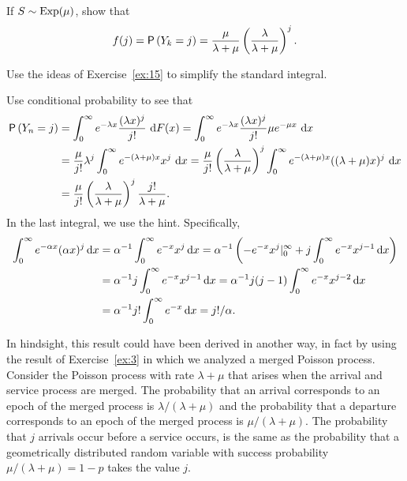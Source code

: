 \begin{extra}\label{ex:74}
 If $S\sim \operatorname{Exp}(\mu)$, show that 
  \begin{equation} \label{eq:41}
f(j) = \P{Y_k = j} = \frac{\mu}{\lambda+\mu}\left(\frac{\lambda}{\lambda+\mu}\right)^j.
  \end{equation}
\begin{hint}
Use the ideas of Exercise~\ref{ex:15} to simplify the standard integral.
\end{hint}
\begin{solution}
Use conditional probability to see that 
\begin{align*}
  \P{Y_n = j} 
&= \int_0^\infty e^{-\lambda x}\frac{(\lambda x)^j}{j!}\, \d F(x) = \int_0^\infty e^{-\lambda x}\frac{(\lambda x)^j}{j!} \mu e^{-\mu x}\, \d x \\
&= \frac{\mu}{j!}\lambda^j \int_0^\infty e^{-(\lambda+\mu) x}x^j\,\d x = \frac{\mu}{j!}\left(\frac{\lambda}{\lambda+\mu}\right)^j \int_0^\infty e^{-(\lambda+\mu) x}((\lambda+\mu)x)^j\,\d x \\
&= \frac{\mu}{j!}\left(\frac{\lambda}{\lambda+\mu}\right)^j \frac{j!}{\lambda+\mu}.
\end{align*}
In the last integral, we use the hint. Specifically, 
\begin{align*}
  \int_0^\infty e^{-\alpha x} (\alpha x)^j \,\text{d}x 
&=  \alpha^{-1} \int_0^\infty e^{- x} x^j \,\text{d}x  
=  \alpha^{-1} \left(-e^{-x}x^j |_0^\infty + j \int_0^\infty e^{- x} x^{j-1} \,\text{d}x \right) \\
&= \alpha^{-1} j \int_0^\infty e^{- x} x^{j-1} \,\text{d}x 
= \alpha^{-1} j(j-1) \int_0^\infty e^{- x} x^{j-2} \,\text{d}x \\
&= \alpha^{-1} j! \int_0^\infty e^{- x} \,\text{d}x 
= j!/\alpha.
\end{align*}


In hindsight, this result could have been derived in another way, in
fact by using the result of Exercise~\ref{ex:3} in which we analyzed a
merged Poisson process. Consider the Poisson process with rate
$\lambda+\mu$ that arises when the arrival and service process are
merged. The probability that an arrival corresponds to an epoch of the
merged process is $\lambda/(\lambda+\mu)$ and the probability that a
departure corresponds to an epoch of the merged process is
$\mu/(\lambda+\mu)$.  The probability that $j$ arrivals occur before a
service occurs, is the same as the probability that a geometrically
distributed random variable with success probability
$\mu/(\lambda+\mu) = 1-p$ takes the value $j$.
\end{solution}
\end{extra}

